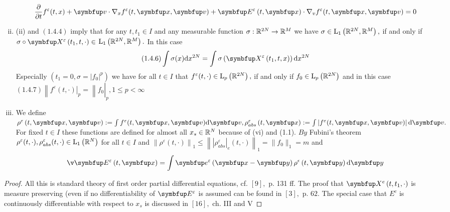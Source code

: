 \begin{lemma}
\begin{enumerate}[(i)]
    $$ \frac{\partial}{\partial t} f^{\varepsilon}(t, x)+\vv\cdot \nabla_{x} f^{\varepsilon}(t, \vx, \vv)+\vE^{\varepsilon}\left(t, \vx\right) \cdot \nabla_v f^{\varepsilon}(t, \vx, \vv)=0$$

    \item  (ii) and $(1.4 .4)$ imply that for any $t, t_{1} \in I$ and any measurable function
$\sigma: {\mathbb{R}}^{2N} \rightarrow {\mathbb{R}}^{M}$ we have $\sigma \in \mathrm{L}_{1}\left({\mathbb{R}}^{2N}, {\mathbb{R}}^{M}\right),$ if and only if $\sigma \circ \vect{X}^{\varepsilon}\left(t_{1}, t, \cdot\right) \in$
$\mathrm{L}_{1}\left({\mathbb{R}}^{2N}, {\mathbb{R}}^{M}\right) .$ In this case
$$(1.4 .6) \int \sigma(x) \mathrm{d} x^{2 N}=\int \sigma\left(\vect{X}^{\varepsilon}\left(t_{1}, t, x\right)\right) \mathrm{d} x^{2 N}$$
Especially $\left(t_{1}=0, \sigma=|f_{0}|^{p}\right)$ we have for all $t \in I$ that $f^{\varepsilon}(t, \cdot) \in \mathrm{L}_{p}\left({\mathbb{R}}^{2N}\right),$ if and
only if $f_{0} \in \mathrm{L}_{p}\left({\mathbb{R}}^{2N}\right)$ and in this case
$\left.(1.4 .7)\left\|\left.f^{\varepsilon}(t, \cdot)\right|_{p}=\right\| f_{0}\right|_{p}, 1 \leqslant p<\infty$


\item  We define $\rho^{\varepsilon}\left(t, \vx, \vv\right):=\int f^{\varepsilon}(t, \vx, \vv) \mathrm{d} \vv,\rho^{\varepsilon}_{abs}\left(t, \vx\right):=\int\left|f^{\varepsilon}(t, \vx, \vv)\right| \mathrm{d} \vv .$ For
fixed $t \in I$ these functions are defined for almost all $x_{s} \in {\mathbb{R}}^{N}$ because of (vi) and
(1.1). $B y$ Fubini's theorem $\rho^{\varepsilon}(t, \cdot),\rho_{abs}^{\varepsilon}(t, \cdot) \in \mathrm{L}_{1}\left({\mathbb{R}}^{N}\right)$ for all $t \in I$ and 
$\left\|\rho^{\varepsilon}(t, \cdot)\right\|_{1} \leqslant\left\|\left|\rho^{\varepsilon}_{abs}\right|_{e}(t, \cdot)\right\|_{1}=\|f_{0}\|_{1}=m$ and
$$
\v\vE^{\varepsilon}\left(t,\vx\right)=\int \vect{e}^{\varepsilon}\left(\vx - \vect{y}\right) \rho^{\epsilon}\left(t, \vect{y}\right) \mathrm{d} \vect{y}
$$

\end{enumerate}
\begin{proof}
    All this is standard theory of first order partial differential equations, cf. $[9],$ p. 131 ff. The proof that $\vect{X}^{e}\left(t, t_{1}, \cdot\right)$ is measure preserving (even if no differentiability of $\vE^{\varepsilon}$ is assumed can be found in $[3],$ p. $62 .$ The special case that $E^{c}$ is continuously differentiable with respect to $x_{s}$ is discussed in $[16],$ ch. III and $\mathrm{V}$
\end{proof}



\end{lemma}
